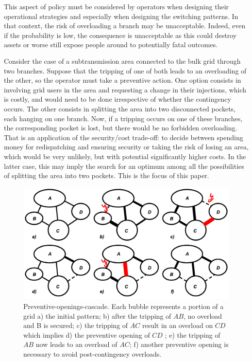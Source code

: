 This aspect of policy must be considered by operators when designing their
operational strategies and especially when designing the switching patterns. In that context, the risk of overloading a branch may be unacceptable. Indeed, even if the probability is low, the consequence is unacceptable as this could destroy assets or worse still expose people around to potentially fatal outcomes.

Consider the case of a subtransmission area connected to the bulk grid through two branches. Suppose that the tripping of one of both leads to an overloading of the other, so the operator must take a preventive action. One option consists in involving grid users in the area and requesting a change in their injections, which is costly, and would need to be done irrespective of whether the contingency occurs. The other consists in splitting the area into two disconnected pockets, each hanging on one branch. Now, if a tripping occurs on one of these branches, the corresponding pocket is lost, but there would be no forbidden overloading.
That is an application of the security/cost trade-off: to decide between spending money for redispatching and ensuring security or taking the risk of losing an area, which would be very unlikely, but with potential significantly higher costs. In the latter case, this may imply the search for an optimum among all the possibilities of splitting the area into two pockets. This is the focus of this paper.

\begin{figure}
    \includegraphics[width=\linewidth]{images/Un-meshing.png}
    \caption{Preventive-openings-cascade. Each bubble represents a portion of a grid a)
    the initial pattern; b) after the tripping of $AB$, no overload and B is secured; c) the tripping of $AC$ result in an overload on $CD$ which implies d) the preventive opening of $CD$ ; e) the tripping of $AB$ now leads to an overload of $AC$; f) another preventive opening is necessary to avoid post-contingency overloads.}
    \label{fig:un-meshing}
\end{figure}

